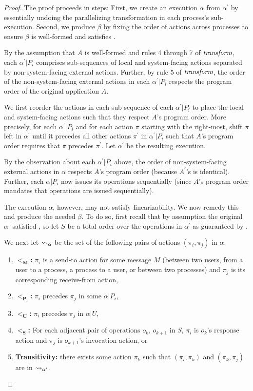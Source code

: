 \begin{proof}
The proof proceeds in steps: First, we create an execution $\alpha$ from
$\alpha^\prime$ by essentially undoing the parallelizing transformation in
each process's sub-execution. Second, we produce $\beta$ by fixing the order
of actions across processes to ensure $\beta$ is well-formed and satisfies \SDL{}.

By the assumption that $A$ is well-formed and rules 4 through 7 of $\operatorname*{\textit{transform}}$,
each $\alpha^\prime | P_i$ comprises sub-sequences of local and
system-facing actions separated by non-system-facing external actions.
Further, by rule 5 of $\operatorname*{\textit{transform}}$, the order of the non-system-facing external
actions in each $\alpha^\prime | P_i$ respects the program order of the
original application $A$. 

We first reorder the actions in each sub-sequence of each $\alpha^\prime | P_i$
to place the local and system-facing actions such that they respect $A$'s program
order. More precisely, for each $\alpha^\prime | P_i$ and for each action $\pi$
starting with the right-most, shift $\pi$ left in $\alpha^\prime$ until it precedes
all other actions $\pi^\prime$ in $\alpha^\prime | P_i$ such that $A$'s program
order requires that $\pi$ precedes $\pi^\prime$. Let $\alpha^\prime$ be the
resulting execution.

By the observation about each $\alpha^\prime | P_i$ above, the order of
non-system-facing external actions in $\alpha$ respects $A$'s program order
(because $A^\prime$'s is identical). Further, each $\alpha | P_i$ now
issues its operations sequentially (since $A$'s program order mandates
that operations are issued sequentially).

The execution $\alpha$, however, may not satisfy linearizability. We now remedy this
and produce the needed $\beta$. To do so, first recall that by assumption the original 
$\alpha^\prime$ satisfied \MDL{}, so let $S$ be a total order over the operations
in $\alpha^\prime$ as guaranteed by \MDL{}.

We next let $\rightsquigarrow_{\alpha}$ be the set of the following pairs of actions
$(\pi_i, \pi_j)$ in $\alpha$:
\begin{enumerate}
    \item $\mathbf{<_M}$\textbf{:} $\pi_i$ is a send-to action for some message $M$
    (between two users, from a user to a process, a process to a user,
    or between two processes) and $\pi_j$ is its corresponding receive-from action,
    \item $\mathbf{<_{P_i}}$\textbf{:} $\pi_i$ precedes $\pi_j$ in some $\alpha | P_i$,
    \item $\mathbf{<_U}$\textbf{:} $\pi_i$ precedes $\pi_j$ in $\alpha | U$,
    \item $\mathbf{<_S}$\textbf{:} For each adjacent pair of operations $o_k$, $o_{k+1}$
    in $S$, $\pi_i$ is $o_k$'s response action and $\pi_j$ is $o_{k+1}$'s invocation action, or
    \item \textbf{Transitivity:} there exists some action $\pi_k$ such that $(\pi_i, \pi_k)$
    and $(\pi_k, \pi_j)$ are in $\rightsquigarrow_{\alpha^\prime}$.
\end{enumerate}


\end{proof}
